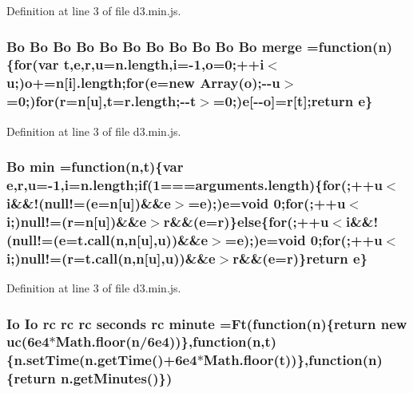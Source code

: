 Definition at line 3 of file d3.\+min.\+js.

\subsubsection[{merge}]{ {\bf Bo} {\bf Bo} {\bf Bo} {\bf Bo} {\bf Bo} {\bf Bo} {\bf Bo} {\bf Bo} {\bf Bo} {\bf Bo} {\bf Bo} merge =function({\bf n})\{{\bf for}(var t,{\bf e},{\bf r},u=n.\+length,{\bf i}=-\/1,{\bf o}=0;++{\bf i}$<$u;){\bf o}+={\bf n}[{\bf i}].length;{\bf for}({\bf e}=new Array({\bf o});-\/-\/u$>$=0;){\bf for}({\bf r}={\bf n}[u],t=r.\+length;-\/-\/t$>$=0;){\bf e}[-\/-\/{\bf o}]={\bf r}[t];{\bf return} {\bf e}\}}\label{d3_8min_8js_ac8a5ee62b51b570b57282a1bab1b43b2}


Definition at line 3 of file d3.\+min.\+js.

\subsubsection[{min}]{ {\bf Bo} min =function({\bf n},t)\{var {\bf e},{\bf r},u=-\/1,{\bf i}=n.\+length;{\bf if}(1===arguments.\+length)\{{\bf for}(;++u$<${\bf i}\&\&!(null!=({\bf e}={\bf n}[u])\&\&{\bf e}$>$={\bf e});){\bf e}=void 0;{\bf for}(;++u$<${\bf i};)null!=({\bf r}={\bf n}[u])\&\&{\bf e}$>${\bf r}\&\&({\bf e}={\bf r})\}{\bf else}\{{\bf for}(;++u$<${\bf i}\&\&!(null!=({\bf e}={\bf t.\+call}({\bf n},{\bf n}[u],u))\&\&{\bf e}$>$={\bf e});){\bf e}=void 0;{\bf for}(;++u$<${\bf i};)null!=({\bf r}={\bf t.\+call}({\bf n},{\bf n}[u],u))\&\&{\bf e}$>${\bf r}\&\&({\bf e}={\bf r})\}{\bf return} {\bf e}\}}\label{d3_8min_8js_a1ab849eeaacec1e29172f73bfa588024}


Definition at line 3 of file d3.\+min.\+js.

\subsubsection[{minute}]{ {\bf Io} {\bf Io} {\bf rc} {\bf rc} {\bf rc} {\bf seconds} {\bf rc} minute =Ft(function({\bf n})\{{\bf return} new {\bf uc}(6e4$\ast$\+Math.\+floor(n/6e4))\},function(n,t)\{n.\+set\+Time(n.\+get\+Time()+6e4$\ast$\+Math.\+floor(t))\},function(n)\{return n.\+get\+Minutes()\})}\label{d3_8min_8js_a986f0e991f993a1da75fb7e4911f9393}


